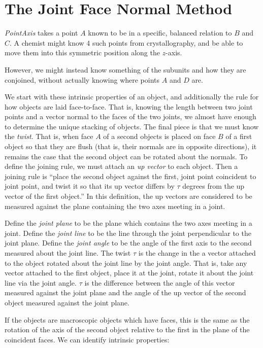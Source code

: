 \documentclass[11pt]{article}
\begin{document}
{\section{The Joint Face Normal Method}
\label{sec:facenormal}

{\em PointAxis} takes a point $A$ known to be in a specific, balanced relation
to $B$ and $C$. A chemist might know 4 such points from crystallography,
and be able to move them into this symmetric position along the $z$-axis.

However, we might instead know something of the subunits and
how they are conjoined, without actually knowing where points $A$
and $D$ are.

We start with these intrinsic properties of an object, and additionally the
rule for how objects are laid face-to-face. That is, knowing the length between two
joint points and a vector normal to the faces of the two joints, we almost have
enough to determine the unique stacking of objects. The final piece is that we must
know the {\em twist}. That is, when face $A$ of a second objects is placed on face $B$
of a first object so that they are flush (that is, their normals are in opposite directions),
it remains the case that the second object can be rotated about the normals. To
define the joining rule, we must attach an {\em up vector} to each object. Then a joining
rule is ``place the second object against the first, joint point coincident to joint point,
and twist it so that its up vector differs by $\tau$ degrees from the up vector of the first
object.'' In this definition, the up vectors are considered to be measured against the plane
containing the two axes meeting in a joint.

Define the {\em joint plane} to be the plane which contains the two axes meeting in a joint.
Define the {\em joint line} to be the line through the joint perpendicular to the joint plane.
Define the {\em joint angle} to be the angle of the first axis to the second measured about
the joint line.
The twist $\tau$ is the change in the a vector attached to the object rotated about the joint
line by the joint angle. That is, take any vector attached to the first object, place it at
the joint, rotate it about the joint line via the joint angle. $\tau$ is the difference
between the angle of this vector measured against the joint plane and the angle of the
up vector of the second object measured against the joint plane.

If the objects are macroscopic objects which have faces, this is the same as the rotation
of the axis of the second object relative to the first in the plane of the coincident faces.
We can identify intrinsic properties:

}
\end{document}
